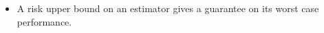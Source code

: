 \begin{frame}[fragile] \frametitle{}

    \begin{itemize}
        \item A risk upper bound on an estimator gives a guarantee on its
            worst case performance.
    \end{itemize}
\end{frame}
\begin{frame}[fragile] \frametitle{}
\end{frame}
\begin{frame}[fragile] \frametitle{}
\end{frame}
\begin{frame}[fragile] \frametitle{}
\end{frame}
\begin{frame}[fragile] \frametitle{}
\end{frame}
\begin{frame}[fragile] \frametitle{}
\end{frame}


